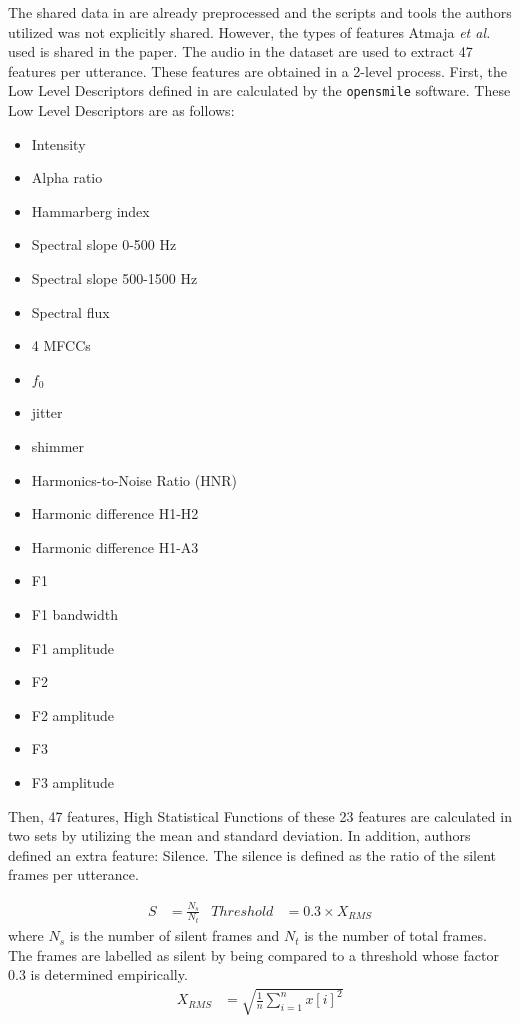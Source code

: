 \documentclass[a4paper,11pt]{article}
\begin{document}
The shared data in \cite{atmaja2020deep} are already preprocessed and the scripts and tools the authors utilized was not explicitly shared. However, the types of features Atmaja \textit{et al.} used is shared in the paper.  
The audio in the dataset are used to extract 47 features per utterance.
These features are obtained in a 2-level process. First, the Low Level Descriptors defined in \cite{eyben2010opensmile} are calculated by the \texttt{opensmile} software. These Low Level Descriptors are as follows: 
\begin{multicols}{2}
\begin{itemize}
    \item Intensity
    \item Alpha ratio
    \item Hammarberg index
    \item Spectral slope 0-500 Hz
    \item Spectral slope 500-1500 Hz
    \item Spectral flux
    \item 4 MFCCs
    \item $f_0$
    \item jitter
    \item shimmer
    \item Harmonics-to-Noise Ratio (HNR)
    \item Harmonic difference H1-H2
    \item Harmonic difference H1-A3
    \item F1
    \item F1 bandwidth
    \item F1 amplitude
    \item F2
    \item F2 amplitude
    \item F3 
    \item F3 amplitude
\end{itemize}
\end{multicols}

Then, 47 features, High Statistical Functions of these 23 features are calculated in two sets by utilizing the mean and standard deviation. In addition, authors defined an extra feature: Silence. The silence is defined as the ratio of the silent frames per utterance. 

\begin{align}
    S &= \frac{N_s}{N_t} & Threshold &= 0.3 \times X_{RMS}
\end{align}
where $N_s$ is the number of silent frames and $N_t$ is the number of total frames.
The frames are labelled as silent by being compared to a threshold whose factor 0.3 is determined empirically. 
\begin{align}
    X_{RMS} &= \sqrt{\frac{1}{n}\sum_{i=1}^n{x[i]}^2}
\end{align}
\end{document}
